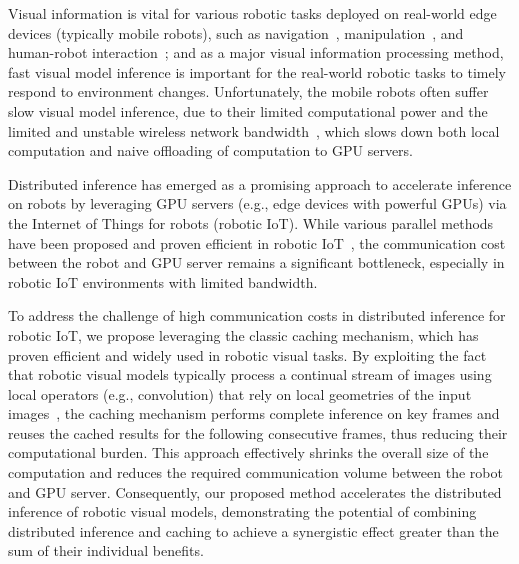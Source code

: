Visual information is vital for various robotic tasks deployed on real-world edge devices (typically mobile robots), such as navigation~\cite{ran2017convolutional}, manipulation~\cite{bayar2018constrained}, and human-robot interaction~\cite{wu2019weight};
and as a major visual information processing method, fast visual model inference is important for the real-world robotic tasks to timely respond to environment changes. 
Unfortunately, the mobile robots often suffer slow visual model inference, due to their limited computational power and the limited and unstable wireless network bandwidth~\cite{yang2022mobile}, which slows down both local computation and naive offloading of computation to GPU servers.

Distributed inference has emerged as a promising approach to accelerate inference on robots by leveraging GPU servers (e.g., edge devices with powerful GPUs) via the Internet of Things for robots (robotic IoT). 
While various parallel methods have been proposed and proven efficient in robotic IoT~\cite{sun2024hybridparallel}, the communication cost between the robot and GPU server remains a significant bottleneck, especially in robotic IoT environments with limited bandwidth.

To address the challenge of high communication costs in distributed inference for robotic IoT, we propose leveraging the classic caching mechanism, which has proven efficient and widely used in robotic visual tasks. 
By exploiting the fact that robotic visual models typically process a continual stream of images using local operators (e.g., convolution) that rely on local geometries of the input images~\cite{o2015introduction,tripp2019approximating}, the caching mechanism performs complete inference on key frames and reuses the cached results for the following consecutive frames, thus reducing their computational burden. 
This approach effectively shrinks the overall size of the computation and reduces the required communication volume between the robot and GPU server. 
Consequently, our proposed method accelerates the distributed inference of robotic visual models, demonstrating the potential of combining distributed inference and caching to achieve a synergistic effect greater than the sum of their individual benefits.


